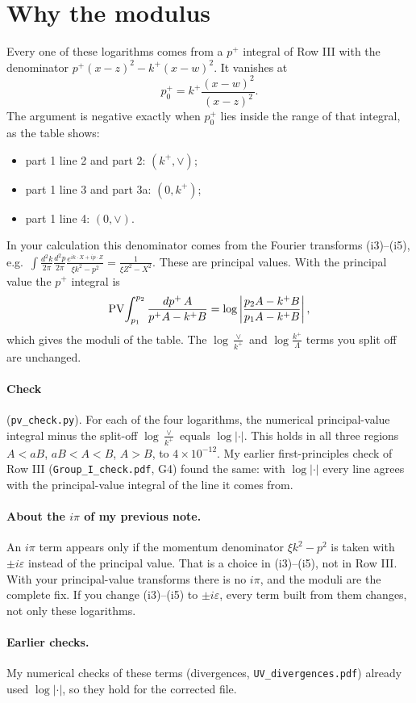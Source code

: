 \documentclass[10pt]{article}
\begin{document}
\section{Why the modulus}
Every one of these logarithms comes from a $p^+$ integral of Row III with the denominator $p^+(x-z)^2-k^+(x-w)^2$. It vanishes at
\begin{equation*}
p^+_0=k^+\frac{(x-w)^2}{(x-z)^2}.
\end{equation*}
The argument is negative exactly when $p^+_0$ lies inside the range of that integral, as the table shows:
\begin{itemize}
\item part 1 line 2 and part 2: $(k^+,\vee)$;
\item part 1 line 3 and part 3a: $(0,k^+)$;
\item part 1 line 4: $(0,\vee)$.
\end{itemize}
In your calculation this denominator comes from the Fourier transforms (i3)--(i5), e.g.\ $\int\frac{d^2k}{2\pi}\frac{d^2p}{2\pi}\frac{e^{ik\cdot X+ip\cdot Z}}{\xi k^2-p^2}=\frac{1}{\xi Z^2-X^2}$. These are principal values. With the principal value the $p^+$ integral is
\begin{equation*}
{\rm PV}\!\int_{p_1}^{p_2}\frac{dp^+\,A}{p^+A-k^+B}=\log\left|\frac{p_2A-k^+B}{p_1A-k^+B}\right|,
\end{equation*}
which gives the moduli of the table. The $\log\frac{\vee}{k^+}$ and $\log\frac{k^+}{\Lambda}$ terms you split off are unchanged.

\paragraph{Check} (\texttt{pv\_check.py}). For each of the four logarithms, the numerical principal-value integral minus the split-off $\log\frac{\vee}{k^+}$ equals $\log|\cdot|$. This holds in all three regions $A<aB$, $aB<A<B$, $A>B$, to $4\times10^{-12}$. My earlier first-principles check of Row III (\texttt{Group\_I\_check.pdf}, G4) found the same: with $\log|\cdot|$ every line agrees with the principal-value integral of the line it comes from.

\paragraph{About the $i\pi$ of my previous note.} An $i\pi$ term appears only if the momentum denominator $\xi k^2-p^2$ is taken with $\pm i\varepsilon$ instead of the principal value. That is a choice in (i3)--(i5), not in Row III. With your principal-value transforms there is no $i\pi$, and the moduli are the complete fix. If you change (i3)--(i5) to $\pm i\varepsilon$, every term built from them changes, not only these logarithms.

\paragraph{Earlier checks.} My numerical checks of these terms (divergences, \texttt{UV\_divergences.pdf}) already used $\log|\cdot|$, so they hold for the corrected file.
\end{document}
